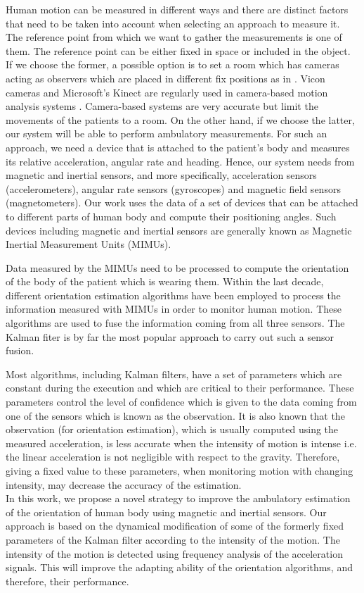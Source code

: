 \documentclass{IOS-Book-Article}
\begin{document}
Human motion can be measured in different ways and there are distinct factors that need to be taken into account when selecting an approach to measure it. The reference point from which we want to gather the measurements is one of them. The reference point can be either fixed in space or included in the object. If we choose the former, a possible option is to set a room which has cameras acting as observers which are placed in different fix positions as in \cite{cerveri_robust_2003}. Vicon\textregistered \,cameras \cite{vicon} and Microsoft's Kinect \cite{kinect} are regularly used in camera-based motion analysis systems \cite{chung_validity_2011}. Camera-based systems are very accurate but limit the movements of the patients to a room. On the other hand, if we choose the latter, our system will be able to perform ambulatory measurements. For such an approach, we need a device that is attached to the patient's body and measures its relative acceleration, angular rate and heading. Hence, our system needs from magnetic and inertial sensors, and more specifically, acceleration sensors (accelerometers), angular rate sensors (gyroscopes) and magnetic field sensors (magnetometers). Our work uses the data of a set of devices that can be attached to different parts of human body and compute their positioning angles. Such devices including magnetic and inertial sensors are generally known as Magnetic Inertial Measurement Units (MIMUs).

Data measured by the MIMUs need to be processed to compute the orientation of the body of the patient which is wearing them. Within the last decade, different orientation estimation algorithms have been employed to process the information measured with MIMUs in order to monitor human motion. These algorithms are used to fuse the information coming from all three sensors. The Kalman fiter \cite{Welch2001} is by far the most popular approach to carry out such a sensor fusion. 

Most algorithms, including Kalman filters, have a set of parameters which are constant during the execution and which are critical to their performance. These parameters control the level of confidence which is given to the data coming from one of the sensors which is known as the observation. It is also known that the observation (for orientation estimation), which is usually computed using the measured acceleration, is less accurate when the intensity of motion is intense i.e. the linear acceleration is not negligible with respect to the gravity. Therefore, giving a fixed value to these parameters, when monitoring motion with changing intensity, may decrease the accuracy of the estimation. \\
In this work, we propose a novel strategy to improve the ambulatory estimation of the orientation of human body using magnetic and inertial sensors. Our approach is based on the dynamical modification of some of the formerly fixed parameters of the Kalman filter according to the intensity of the motion. The intensity of the motion is detected using frequency analysis of the acceleration signals. This will improve the adapting ability of the orientation algorithms, and therefore, their performance.\\
\end{document}
